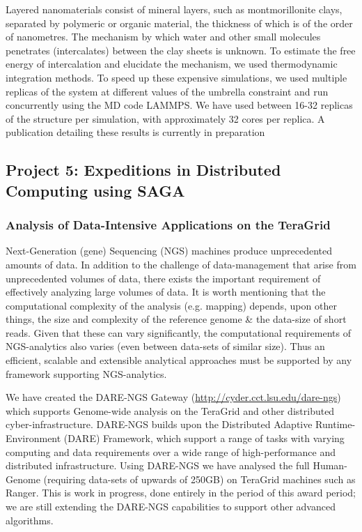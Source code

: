 \documentclass[a4paper,10pt]{article}
\begin{document}
Layered nanomaterials consist of mineral layers, such as montmorillonite clays, separated by polymeric or organic material, the thickness of which is of the order of nanometres. The mechanism by which water and other small molecules penetrates (intercalates) between the clay sheets is unknown. To estimate the free energy of intercalation and elucidate the mechanism, we used thermodynamic integration methods. To speed up these expensive simulations, we used multiple replicas of the system at different values of the umbrella constraint and run concurrently using the MD code LAMMPS. We have used between 16-32 replicas of the structure per simulation, with approximately 32 cores per replica. A publication detailing these results is currently in preparation~\cite{Ref11}

\subsection{Project 5: Expeditions in Distributed Computing using SAGA}

\subsubsection{Analysis of Data-Intensive Applications on the TeraGrid}

Next-Generation (gene) Sequencing (NGS) machines produce unprecedented amounts of data.  In addition to the challenge of data-management that arise from unprecedented volumes of data, there exists the important requirement of effectively analyzing large volumes of data.  It is worth mentioning that the computational complexity of the analysis (e.g. mapping) depends, upon other things, the size and complexity of the reference genome \& the data-size of short reads.  Given that these can vary significantly, the computational requirements of NGS-analytics also varies (even between data-sets of similar size).  Thus an efficient, scalable and extensible analytical approaches must be supported by any framework supporting NGS-analytics.

We have created the DARE-NGS Gateway (\url{http://cyder.cct.lsu.edu/dare-ngs}) which supports Genome-wide analysis on the TeraGrid and other distributed cyber-infrastructure.  DARE-NGS builds upon the Distributed Adaptive Runtime-Environment (DARE) Framework, which support a range of tasks with varying computing and data requirements over a wide range of high-performance and distributed infrastructure.  Using DARE-NGS we have analysed the full Human-Genome (requiring data-sets of upwards of 250GB) on TeraGrid machines such as Ranger. This is work in progress, done entirely in the period of this award period; we are still extending the DARE-NGS capabilities to support other advanced algorithms\cite{ecmls11}.
\end{document}
